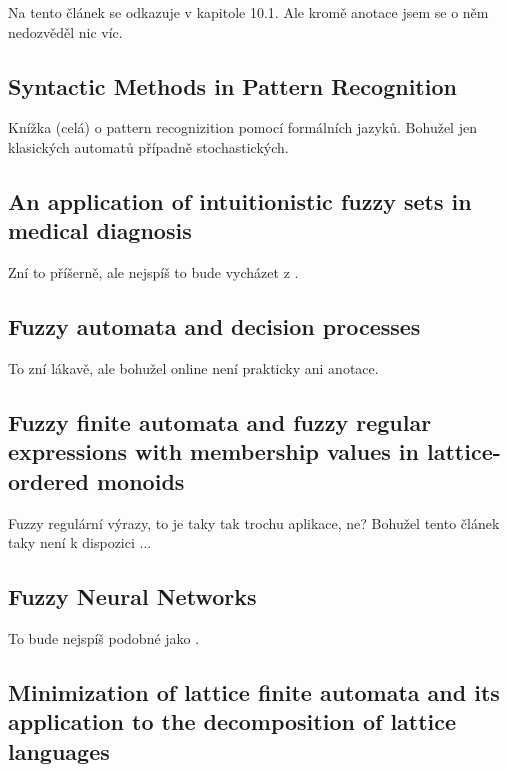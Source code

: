 \documentclass[a4paper,10pt]{article}
\begin{document}
Na tento článek se odkazuje \cite{MorMal-FuzzAutAndLangs} v kapitole 10.1. Ale kromě anotace jsem se o něm nedozvěděl nic víc.

\subsection{Syntactic Methods in Pattern Recognition \cite{Fu-SynMethPattRec}}

Knížka (celá) o pattern recognizition pomocí formálních jazyků. Bohužel jen klasických automatů případně stochastických.


\subsection{An application of intuitionistic fuzzy sets in medical diagnosis \cite{SupBisAkh-AppIntFuzzSetMedDiag}}

Zní to příšerně, ale nejspíš to bude vycházet z \cite{GupSar-FuzzAutDecProc}.


\subsection{Fuzzy automata and decision processes\cite{GupSar-FuzzAutDecProc}}

To zní lákavě, ale bohužel online není prakticky ani anotace.

\subsection{Fuzzy finite automata and fuzzy regular expressions with membership values in lattice-ordered monoids \cite{LiPed-FuzzFinAutFuzzRegExMembValLattOrdMon}}

Fuzzy regulární výrazy, to je taky tak trochu aplikace, ne? Bohužel tento článek taky není k dispozici ...


\subsection{Fuzzy Neural Networks \cite{LeeLee-FuzzNeuNet}}

To bude nejspíš podobné jako \cite{DarAhmSin-AppFuzzAutTheKnBsNeuNetDevBasLeaMod}. 


\subsection{Minimization of lattice finite automata and its application to the decomposition of lattice languages \cite{LiPed-MinLattFinAutAppDecoLattLang}}
\end{document}
